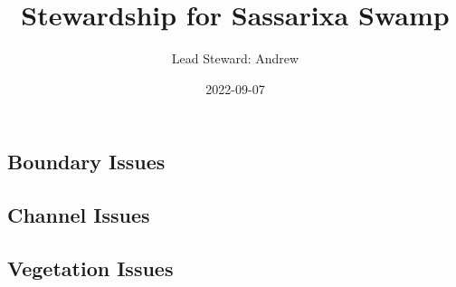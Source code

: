 \documentclass[
]{article}
\title{Stewardship for Sassarixa Swamp}
\author{Lead Steward: Andrew}
\date{2022-09-07}
\begin{document}
\maketitle

\hypertarget{boundary-issues}{%
\subsection{Boundary Issues}\label{boundary-issues}}

\textbar\textbar{} \textbar\textbar{} \textbar\textbar{}
\textbar\textbar{}

\hypertarget{channel-issues}{%
\subsection{Channel Issues}\label{channel-issues}}

\textbar\textbar{} \textbar\textbar{} \textbar\textbar{}
\textbar\textbar{}

\hypertarget{vegetation-issues}{%
\subsection{Vegetation Issues}\label{vegetation-issues}}
\end{document}
